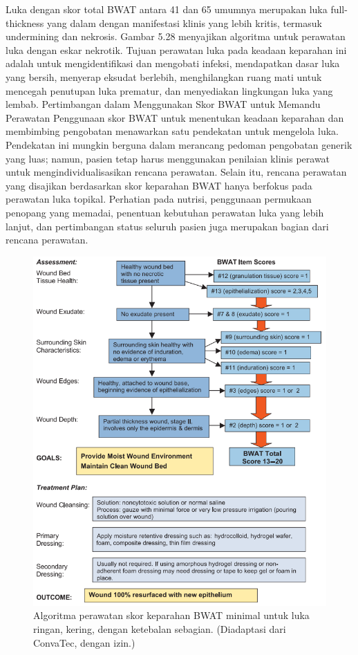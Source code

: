 \begin{enumerate}
	Luka dengan skor total BWAT antara 41 dan 65 umumnya merupakan luka full-thickness yang dalam dengan manifestasi klinis yang lebih kritis, termasuk undermining dan nekrosis. Gambar 5.28 menyajikan algoritma untuk perawatan luka dengan eskar nekrotik. Tujuan perawatan luka pada keadaan keparahan ini adalah untuk mengidentifikasi dan mengobati infeksi, mendapatkan dasar luka yang bersih, menyerap eksudat berlebih, menghilangkan ruang mati untuk mencegah penutupan luka prematur, dan menyediakan lingkungan luka yang lembab.
Pertimbangan dalam Menggunakan Skor BWAT untuk Memandu Perawatan
Penggunaan skor BWAT untuk menentukan keadaan keparahan dan membimbing pengobatan menawarkan satu pendekatan untuk mengelola luka. Pendekatan ini mungkin berguna dalam merancang pedoman pengobatan generik yang luas; namun, pasien tetap harus menggunakan penilaian klinis perawat untuk mengindividualisasikan rencana perawatan. Selain itu, rencana perawatan yang disajikan berdasarkan skor keparahan BWAT hanya berfokus pada perawatan luka topikal. Perhatian pada nutrisi, penggunaan permukaan penopang yang memadai, penentuan kebutuhan perawatan luka yang lebih lanjut, dan pertimbangan status seluruh pasien juga merupakan bagian dari rencana perawatan.
\end{enumerate}
\begin{figure}[H]
	\centering
	\includegraphics[keepaspectratio, width=14cm]{gambar/gambar_23}
	\caption{Algoritma perawatan skor keparahan BWAT minimal untuk luka ringan, kering, dengan ketebalan sebagian. (Diadaptasi dari ConvaTec, dengan izin.) \citep{sussman2012}}
	\label{gambar:gambar_23}
\end{figure}

